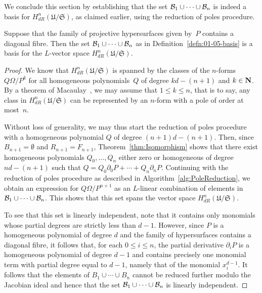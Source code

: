 We conclude this section by establishing that the set 
$\mathcal{B}_1 \cup \dotsb \cup \mathcal{B}_n$ is indeed a basis for 
$H_{dR}^n(\mathfrak{U}/\mathfrak{S})$, as claimed earlier, 
using the reduction of poles procedure.

\begin{thm} \label{thm:Basis}
Suppose that the family of projective hypersurfaces given by~$P$ contains 
a diagonal fibre.  Then the set $\mathcal{B}_1 \cup \dotsb \cup \mathcal{B}_n$ as in 
Definition~\ref{defn:01-05-basis} is a basis for the $L$-vector space 
$H_{dR}^n(\mathfrak{U}/\mathfrak{S})$.
\end{thm}

\begin{proof}
We know that $H_{dR}^n(\mathfrak{U}/\mathfrak{S})$ is spanned 
by the classes of the $n$-forms $Q \Omega / P^k$ for all 
homogeneous polynomials~$Q$ of degree $kd-(n+1)$ and $k \in \mathbf{N}$.  
By a theorem of Macaulay~\citep[\S 4, (4.11)]{Griffiths1969}, 
we may assume that $1 \leq k \leq n$, that is to say, any class in 
$H_{dR}^n(\mathfrak{U}/\mathfrak{S})$ can be represented by an 
$n$-form with a pole of order at most~$n$.

Without loss of generality, we may thus start the reduction of poles 
procedure with a homogeneous polynomial $Q$ of degree $(n+1)d-(n+1)$.  Then, 
since $B_{n+1} = \emptyset$ and $R_{n+1} = F_{n+1}$, 
Theorem~\ref{thm:Isomorphism} shows that there exist homogeneous polynomials 
$Q_0, \dotsc, Q_n$ either zero or homogeneous of degree $nd-(n+1)$ such that 
$Q = Q_0 \partial_0 P + \dotsb + Q_n \partial_n P$.  Continuing with the 
reduction of poles procedure as described in 
Algorithm~\ref{alg:PoleReduction}, we obtain an expression for 
$Q \Omega / P^{n+1}$ as an $L$-linear combination of elements in 
$\mathcal{B}_1 \cup \dotsb \cup \mathcal{B}_n$.  This shows that this set spans the vector 
space $H_{dR}^n(\mathfrak{U}/\mathfrak{S})$.

To see that this set is linearly independent, note that it contains only 
monomials whose partial degrees are strictly less than $d-1$.  However, since 
$P$ is a homogeneous polynomial of degree $d$ and the family of hypersurfaces 
contains a diagonal fibre, it follows that, for each $0 \leq i \leq n$, the 
partial derivative $\partial_i P$ is a homogeneous polynomial of degree $d-1$ 
and contains precisely one monomial term with partial degree equal to $d-1$, 
namely that of the monomial $x_i^{d-1}$.  It follows that the elements of 
$B_1 \cup \dotsb \cup B_n$ cannot be reduced further modulo the Jacobian 
ideal and hence that the set $\mathcal{B}_1 \cup \dotsb \cup \mathcal{B}_n$ is linearly 
independent.
\end{proof}

